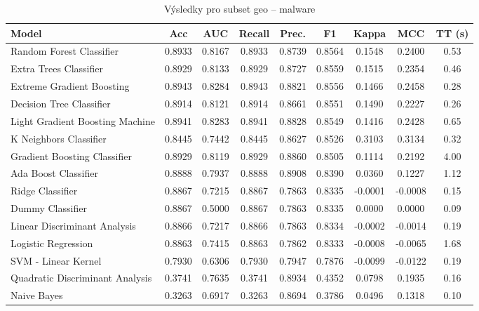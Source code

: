 \begin{table}[H]
  \centering
  \small
  \caption{Výsledky pro subset geo – malware}
  \begin{tabular}{|l|c|c|c|c|c|c|c|c|}
    \hline
    \textbf{Model} & \textbf{Acc} & \textbf{AUC} & \textbf{Recall} & \textbf{Prec.} & \textbf{F1} & \textbf{Kappa} & \textbf{MCC} & \textbf{TT (s)} \\
    \hline
    Random Forest Classifier & 0.8933 & 0.8167 & 0.8933 & 0.8739 & 0.8564 & 0.1548 & 0.2400 & 0.53 \\
    Extra Trees Classifier & 0.8929 & 0.8133 & 0.8929 & 0.8727 & 0.8559 & 0.1515 & 0.2354 & 0.46 \\
    Extreme Gradient Boosting & 0.8943 & 0.8284 & 0.8943 & 0.8821 & 0.8556 & 0.1466 & 0.2458 & 0.28 \\
    Decision Tree Classifier & 0.8914 & 0.8121 & 0.8914 & 0.8661 & 0.8551 & 0.1490 & 0.2227 & 0.26 \\
    Light Gradient Boosting Machine & 0.8941 & 0.8283 & 0.8941 & 0.8828 & 0.8549 & 0.1416 & 0.2428 & 0.65 \\
    K Neighbors Classifier & 0.8445 & 0.7442 & 0.8445 & 0.8627 & 0.8526 & 0.3103 & 0.3134 & 0.32 \\
    Gradient Boosting Classifier & 0.8929 & 0.8119 & 0.8929 & 0.8860 & 0.8505 & 0.1114 & 0.2192 & 4.00 \\
    Ada Boost Classifier & 0.8888 & 0.7937 & 0.8888 & 0.8908 & 0.8390 & 0.0360 & 0.1227 & 1.12 \\
    Ridge Classifier & 0.8867 & 0.7215 & 0.8867 & 0.7863 & 0.8335 & -0.0001 & -0.0008 & 0.15 \\
    Dummy Classifier & 0.8867 & 0.5000 & 0.8867 & 0.7863 & 0.8335 & 0.0000 & 0.0000 & 0.09 \\
    Linear Discriminant Analysis & 0.8866 & 0.7217 & 0.8866 & 0.7863 & 0.8334 & -0.0002 & -0.0014 & 0.19 \\
    Logistic Regression & 0.8863 & 0.7415 & 0.8863 & 0.7862 & 0.8333 & -0.0008 & -0.0065 & 1.68 \\
    SVM - Linear Kernel & 0.7930 & 0.6306 & 0.7930 & 0.7947 & 0.7876 & -0.0099 & -0.0122 & 0.19 \\
    Quadratic Discriminant Analysis & 0.3741 & 0.7635 & 0.3741 & 0.8934 & 0.4352 & 0.0798 & 0.1935 & 0.16 \\
    Naive Bayes & 0.3263 & 0.6917 & 0.3263 & 0.8694 & 0.3786 & 0.0496 & 0.1318 & 0.10 \\
    \hline
  \end{tabular}
\end{table}
\vspace{0.5cm}


